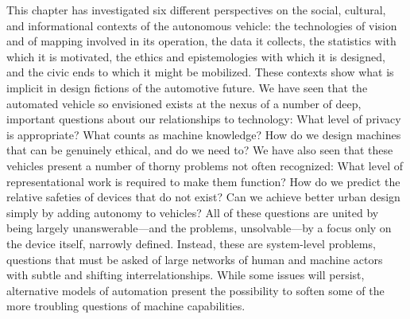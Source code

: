 This chapter has investigated six different perspectives on the
social, cultural, and informational contexts of the autonomous
vehicle:  the technologies of vision and of mapping involved
in its operation, the 
data it collects, the statistics with which it is motivated, the
ethics and epistemologies with which it is designed, and the civic
ends to which it might be mobilized. These contexts show what is implicit in design
fictions of the automotive future. We
have seen that the automated vehicle so envisioned exists at the
nexus of a number of deep, important questions about our relationships
to technology: What level of privacy is appropriate? What counts as machine
knowledge? How do we design machines that can be genuinely ethical,
and do we need to? We have also seen that these vehicles present a
number of thorny problems not often recognized: What level of
representational work is required to make them function? How do we
predict the relative safeties of devices that do not exist? Can we
achieve better urban design simply by adding autonomy to vehicles?
All of these questions are united by being largely unanswerable---and
the problems, unsolvable---by a focus only on the device itself,
narrowly defined. Instead, these are system-level problems, questions
that must be asked of large networks of human and machine actors with
subtle and shifting interrelationships. While some issues will
persist, alternative models of 
automation present the possibility to soften some of the more
troubling questions of machine capabilities. 

